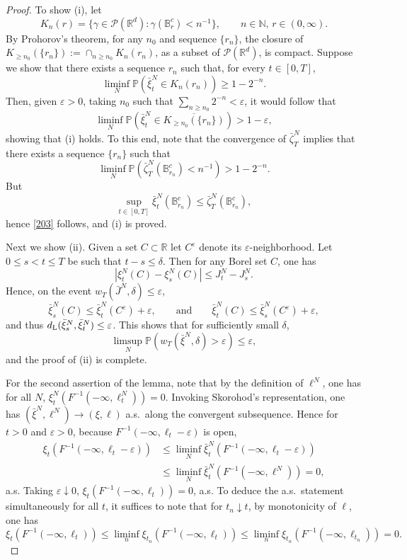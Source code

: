 \documentclass[11pt]{amsart}
\theoremstyle{plain}
\newcommand{\eps}{\varepsilon}
\newcommand{\gam}{\gamma}
\newcommand{\del}{\delta}
\newcommand{\N}{{\mathbb N}}
\newcommand{\R}{{\mathbb R}}
\newcommand{\PP}{{\mathbb P}}
\newcommand{\calP}{{\mathcal P}}
\newcommand{\oo}{\overline}
\newcommand{\iy}{\infty}
\begin{document}
\begin{proof}
To show (i), let
\[
K_n(r)=\{\gam\in\calP(\R^d):\gam(\mathbb{B}_r^c)<n^{-1}\},
\qquad n\in\N,\,r\in(0,\iy).
\]
By Prohorov's theorem, for any $n_0$ and sequence $\{r_n\}$,
the closure of $K_{\ge n_0}(\{r_n\}):=\cap_{n\ge n_0}K_n(r_n)$,
as a subset of $\calP(\R^d)$, is compact. Suppose we show that
there exists a sequence $r_n$ such that, for every $t\in[0,T]$,
\begin{equation}
\label{203}
\liminf_N\PP(\bar\xi^N_t\in K_n(r_n))\ge1-2^{-n}.
\end{equation}
Then, given $\eps>0$, taking $n_0$ such that
$\sum_{n\ge n_0}2^{-n}<\eps$, it would follow that
\[
\liminf_N\PP(\bar\xi^N_t\in \oo{K_{\ge n_0}(\{r_n\})})>1-\eps,
\]
showing that (i) holds.
To this end, note that the convergence of $\bar\zeta^N_T$ implies that
there exists a sequence $\{r_n\}$ such that
\[
\liminf_N\PP(\bar\zeta^N_T(\mathbb{B}_{r_n}^c)<n^{-1})>1-2^{-n}.
\]
But
\[
\sup_{t\in[0,T]}\bar\xi^N_t(\mathbb{B}_{r_n}^c)
\le\bar\zeta^N_T(\mathbb{B}_{r_n}^c),
\]
hence \eqref{203} follows, and (i) is proved.

Next we show (ii).
Given a set $C\subset\R$ let $C^\eps$ denote its $\eps$-neighborhood.
Let $0\le s<t\le T$ be such that $t-s\le\del$. Then for any Borel set $C$, one has
\[
|\xi^N_t(C)-\xi^N_s(C)|\le J^N_t-J^N_s.
\]
Hence, on the event $w_T(\bar J^N,\del)\le\eps$,
\[
\bar\xi^N_s(C) \le \bar\xi^N_t(C^\eps) + \eps,
\qquad \text{and} \qquad
\bar\xi^N_t(C) \le \bar\xi^N_s(C^\eps)+ \eps,
\]
and thus $d_{\rm L}(\bar\xi^N_s,\bar\xi^N_t)\le\eps$.
This shows that for sufficiently small $\del$,
\[
\limsup_N \PP(w_T(\bar\xi^N,\del)>\eps)\le\eps,
\]
and the proof of (ii) is complete.

For the second assertion of the lemma, note that
by the definition of $\ell^N$, one has for all $N$,
$\xi^N_t(F^{-1}(-\iy,\ell^N_t))=0$.
Invoking Skorohod's representation, one has
$(\bar\xi^N,\ell^N)\to(\xi,\ell)$ a.s.\ along the convergent subsequence.
Hence for $t>0$ and $\eps>0$, because $F^{-1}(-\iy,\ell_t-\eps)$ is open,
\begin{align*}
\xi_t(F^{-1}(-\iy,\ell_t-\eps)) &\le \liminf_N\bar\xi^N_t(F^{-1}(-\iy,\ell_t-\eps))
\\
&\le\liminf_N\bar\xi^N_t(F^{-1}(-\iy,\ell^N))=0,
\end{align*}
a.s.
Taking $\eps\downarrow0$, $\xi_t(F^{-1}(-\iy,\ell_t))=0$, a.s.
To deduce the a.s.\ statement simultaneously for all $t$, it suffices to
note that for $t_n\downarrow t$, by monotonicity of $\ell$, one has
\[
\xi_t(F^{-1}(-\iy,\ell_t))\le\liminf_n\xi_{t_n}(F^{-1}(-\iy,\ell_t))\le\liminf_n\xi_{t_n}(F^{-1}(-\iy,\ell_{t_n}))=0.
\]
\end{proof}
\end{document}
